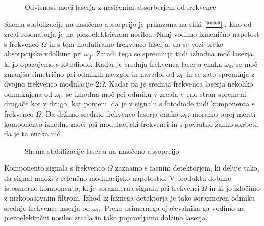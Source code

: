 \begin{figure}[tbp]
\label{s5.12} \vskip 5cm
\caption{Odvisnost moči laserja z nasičenim absorberjem od frekvence}
\end{figure}

Shema stabilizacije na nasičeno absorpcijo je prikazana na sliki \ref{****}%
. Eno od zrcal resonatorja je na piezoelektričnem nosilcu. Nanj vodimo
izmenično napetost s frekvenco $\Omega$ in s tem moduliramo frekvenco
laserja, da se vozi preko absorpcijske vdolbine pri $\omega_0$. Zaradi tega
se spreminja tudi izhodna moč laserja, ki jo opazujemo s fotodiodo. Kadar
je srednja frekvenca laserja enaka $\omega_0$, se moč zmanjša simetrično
pri odmikih navzgor in navzdol od $\omega_0$ in se zato spreminja z dvojno
frekvenco modulacije $2\Omega$. Kadar pa je srednja frekvenca laserja
nekoliko odmaknjena od $\omega_0$, se izhodna moč pri odmiku v zrcala v eno
stran spremeni drugače kot v drugo, kar pomeni, da je v signalu s fotodiode
tudi komponenta s frekvenco $\Omega$. Da držimo srednjo frekvenco laserja
enako $\omega_0$, moramo torej meriti komponento izhodne moči pri
modulacijski frekvenci in s povratno zanko skrbeti, da je ta enaka nič.

\begin{figure}[tbp]
\label{s5.13} \vskip 7cm
\caption{Shema stabilizacije laserja na nasičeno absoprcijo}
\end{figure}

Komponento signala s frekvenco $\Omega$ zaznamo s faznim detektorjem, ki
deluje tako, da signal množi z refenčno modulacijsko napetostjo. V
produktu dobimo istosmerno komponento, ki je sorazmerna signalu pri
frekvenci $\Omega$ in ki jo izločimo z nizkopasovnim filtrom. Izhod iz
faznega detektorja je tako sorazmeren odmiku srednje frekvence laserja od $%
\omega_0$. Preko primernega ojačevalnika ga vodimo na piezoelektrični
nosilec zrcala in tako popravljamo dolžino laserja.


